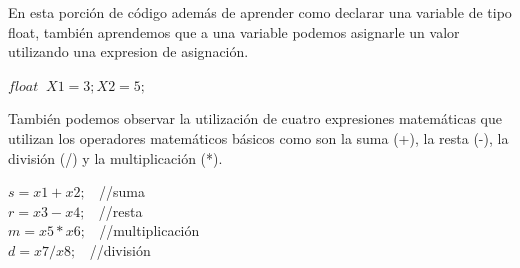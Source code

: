 \documentclass[a4paper,12pt,spanish]{article}
\begin{document}
En esta porción de código además de aprender como declarar una variable de tipo float, también  aprendemos que a una variable podemos asignarle un valor utilizando una expresion de asignación.

    \begin{tcolorbox}[title=''Declaración de variable y Expresión de asignación'']
      $ float \; \;  X1=3; X2=5; $
    \end{tcolorbox}

    También podemos observar la utilización de cuatro expresiones matemáticas que utilizan los operadores matemáticos básicos como son la suma (+), la resta (-), la división (/) y la multiplicación (*).\\

    \begin{tcolorbox}[title=''Expresiones matemáticas'']
    $  s=x1+x2;  \;\; $               //suma\\
    $  r=x3-x4; \; \; $    //resta \\
    $  m=x5*x6; \;\; $     //multiplicación\\
    $  d=x7/x8; \;\; $    //división
    \end{tcolorbox}
\end{document}
